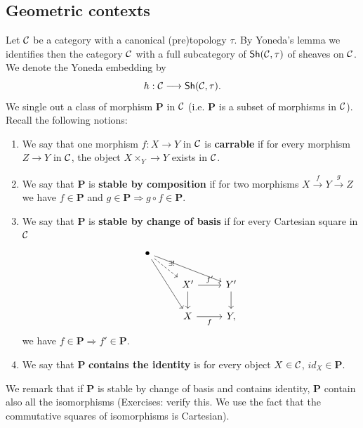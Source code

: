 \documentclass{tufte-book} %
\numberwithin{dummy}{section}
\newcommand{\calc}{{\cal C}}
\newcommand{\Lrta}{\Longrightarrow}
\newcommand{\lrta}{\longrightarrow}
\newcommand{\bfp}{\mathbf{P}}
\begin{document}
\subsection{Geometric contexts}
Let $\calc$ be a category with a canonical (pre)topology $\tau$. By Yoneda's lemma we identifies then the category $\calc$ with a full subcategory of $\mathsf{Sh}(\calc,\tau)$ of sheaves on $\calc$. We  denote the Yoneda embedding by 
$$
h:\calc\lrta \mathsf{Sh}(\calc,\tau).
$$
We single out a class of morphism $\mathbf{P}$ in $\calc$ (i.e. $\mathbf{P}$ is a subset of morphisms in $\calc$). Recall the following notions:
\begin{enumerate}
\item We say that one morphism $f:X\lrta Y$ in $\calc$ is \textbf{carrable} if for every morphism $Z\lrta Y$ in $\calc$, the object $X\times_Y\lrta Y$ exists in $\calc$.
\item We say that $\mathbf{P}$ is \textbf{stable by composition} if for two morphisms $X\overset{f}{\lrta}Y\overset{g}{\lrta }Z$ we have $f\in \mathbf{P}$ and $g\in \mathbf{P}\Lrta g\circ f\in \mathbf{P}$.
\item We say that $\bfp$ is \textbf{stable by change of basis} if for every Cartesian square in $\calc$
$$
\begin{tikzcd}
\bullet \arrow[rdd] \arrow[rrd] \arrow[rd, "\exists!", dashed] &  &  \\
 & X' \arrow[r, "f'"] \arrow[d] & Y' \arrow[d] \\
 & X \arrow[r, "f"'] & Y,
\end{tikzcd}
$$
we have $f\in \bfp\Lrta f'\in \bfp$.
\item We say that $\bfp$ \textbf{contains the identity} is for every object $X\in \calc$, $id_X\in \bfp$.
\end{enumerate}
We remark that if $\bfp$ is stable by change of basis and contains identity, $\bfp$ contain also all the isomorphisms (Exercises: verify this. We use the fact that the commutative squares of isomorphisms is Cartesian).
\end{document}

